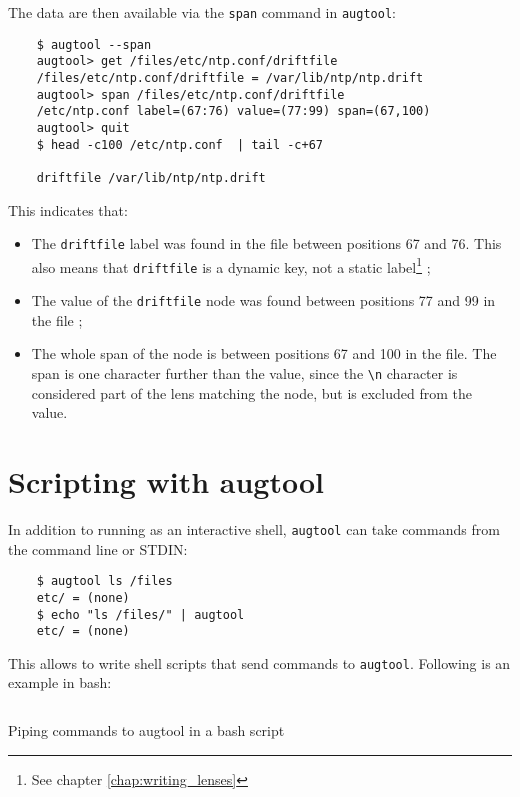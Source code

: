 The data are then available via the \verb!span! command in \verb!augtool!:


\begin{verbatim}
    $ augtool --span
    augtool> get /files/etc/ntp.conf/driftfile
    /files/etc/ntp.conf/driftfile = /var/lib/ntp/ntp.drift
    augtool> span /files/etc/ntp.conf/driftfile
    /etc/ntp.conf label=(67:76) value=(77:99) span=(67,100)
    augtool> quit
    $ head -c100 /etc/ntp.conf  | tail -c+67

    driftfile /var/lib/ntp/ntp.drift
\end{verbatim}

This indicates that:

\begin{itemize}
\item
  The \verb!driftfile! label was found in the file between positions 67 and 76. This also means that \verb!driftfile! is a dynamic key, not a static label\footnote{See chapter \ref{chap:writing_lenses}} ;
\item
  The value of the \verb!driftfile! node was found between positions 77 and 99 in the file ;
\item
  The whole span of the node is between positions 67 and 100 in the file. The span is one character further than the value, since the \verb!\n! character is considered part of the lens matching the node, but is excluded from the value.
\end{itemize}
\section{Scripting with augtool}


In addition to running as an interactive shell, \verb!augtool! can take commands from the command line or STDIN:

 

\begin{verbatim}
    $ augtool ls /files
    etc/ = (none)
    $ echo "ls /files/" | augtool
    etc/ = (none)
\end{verbatim}

This allows to write shell scripts that send commands to \verb!augtool!. Following is an example in bash:

  

\begin{listing}[H]
  \inputminted[linenos,frame=leftline]{bash}{listings/augtool_wrap.sh}
  \caption{Piping commands to augtool in a bash script}
  \label{lst:augtool_wrap}
\end{listing}

